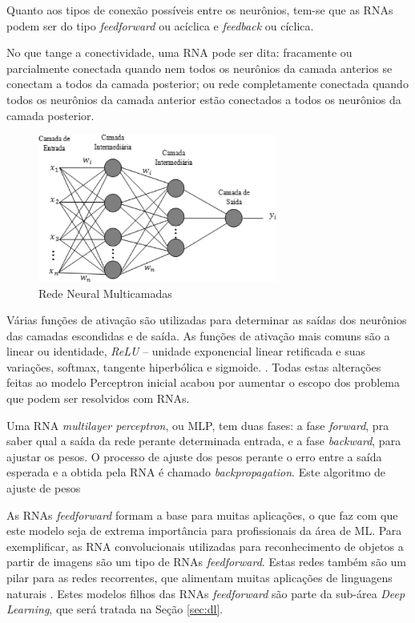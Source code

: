 Quanto aos tipos de conexão possíveis entre os neurônios, tem-se que as RNAs podem ser do tipo \emph{feedforward} ou acíclica  e \emph{feedback} ou cíclica.

No que tange a conectividade, uma RNA pode ser dita: fracamente ou parcialmente conectada quando nem todos os neurônios da camada anterios se conectam a todos da camada posterior; ou rede completamente conectada quando todos os neurônios da camada anterior estão conectados a todos os neurônios da camada posterior.

\begin{figure}[ht]
	\centering
	\includegraphics[width=0.7\textwidth]{img/mlprna.jpg}
	\caption{Rede Neural Multicamadas}
	\label{fig:mlp}
\end{figure}

Várias funções de ativação são utilizadas para determinar as saídas dos neurônios das camadas escondidas e de saída. As funções de ativação mais comuns são a linear ou identidade, \emph{ReLU} -- unidade exponencial linear retificada e suas variações, softmax, tangente hiperbólica e sigmoide.
. Todas estas alterações feitas ao modelo Perceptron inicial acabou por aumentar o escopo dos problema que podem ser resolvidos com RNAs.

Uma RNA \emph{multilayer perceptron}, ou MLP, tem duas fases: a fase \emph{forward}, pra saber qual a saída da rede perante determinada entrada, e a fase \emph{backward}, para ajustar os pesos. O processo de ajuste dos pesos perante o erro entre a saída esperada e a obtida pela RNA é chamado \emph{backpropagation}. Este algoritmo de ajuste de pesos 


As RNAs \emph{feedforward} formam a base para muitas aplicações, o que faz com que este modelo seja de extrema importância para profissionais da área de ML. Para exemplificar, as RNA convolucionais utilizadas para reconhecimento de objetos a partir de imagens são um tipo de RNAs \emph{feedforward}. Estas redes também são um pilar para as redes recorrentes, que alimentam muitas aplicações de linguagens naturais \cite{goodfellow2016deep}. Estes modelos filhos das RNAs \emph{feedforward} são parte da sub-área \emph{Deep Learning}, que será tratada na Seção \ref{sec:dl}.

